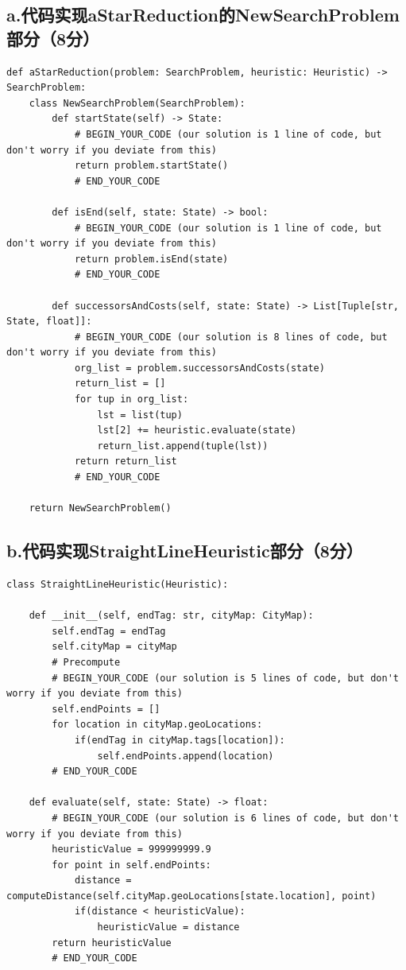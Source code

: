 \documentclass{article}
\begin{document}
\subsection*{a.代码实现aStarReduction的NewSearchProblem部分（8分）}
\begin{lstlisting}
def aStarReduction(problem: SearchProblem, heuristic: Heuristic) -> SearchProblem:
    class NewSearchProblem(SearchProblem):
        def startState(self) -> State:
            # BEGIN_YOUR_CODE (our solution is 1 line of code, but don't worry if you deviate from this)
            return problem.startState()
            # END_YOUR_CODE

        def isEnd(self, state: State) -> bool:
            # BEGIN_YOUR_CODE (our solution is 1 line of code, but don't worry if you deviate from this)
            return problem.isEnd(state)
            # END_YOUR_CODE

        def successorsAndCosts(self, state: State) -> List[Tuple[str, State, float]]:
            # BEGIN_YOUR_CODE (our solution is 8 lines of code, but don't worry if you deviate from this)
            org_list = problem.successorsAndCosts(state)
            return_list = []
            for tup in org_list:
                lst = list(tup)
                lst[2] += heuristic.evaluate(state)
                return_list.append(tuple(lst))
            return return_list
            # END_YOUR_CODE

    return NewSearchProblem()
\end{lstlisting}

\subsection*{b.代码实现StraightLineHeuristic部分（8分）}
\begin{lstlisting}
class StraightLineHeuristic(Heuristic):

    def __init__(self, endTag: str, cityMap: CityMap):
        self.endTag = endTag
        self.cityMap = cityMap
        # Precompute
        # BEGIN_YOUR_CODE (our solution is 5 lines of code, but don't worry if you deviate from this)
        self.endPoints = []
        for location in cityMap.geoLocations:
            if(endTag in cityMap.tags[location]):
                self.endPoints.append(location)
        # END_YOUR_CODE

    def evaluate(self, state: State) -> float:
        # BEGIN_YOUR_CODE (our solution is 6 lines of code, but don't worry if you deviate from this)
        heuristicValue = 999999999.9
        for point in self.endPoints:
            distance = computeDistance(self.cityMap.geoLocations[state.location], point)
            if(distance < heuristicValue):
                heuristicValue = distance
        return heuristicValue
        # END_YOUR_CODE
\end{lstlisting}
\end{document}
